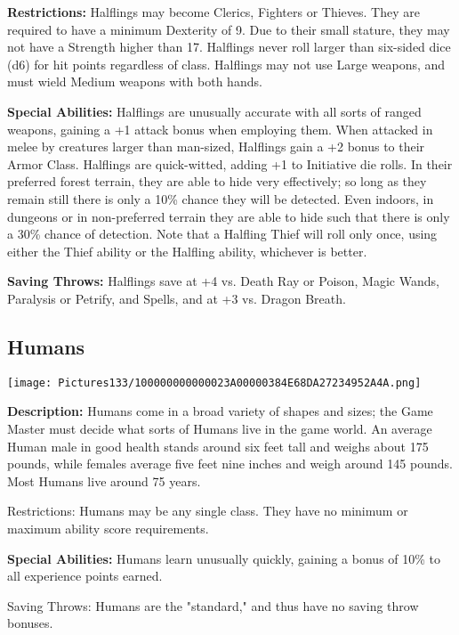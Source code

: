 \documentclass[a4paper,twoside,openany,10pt]{book}
\begin{document}
\begin{multicols}{2}
\textbf{Restrictions: } Halflings may become Clerics, Fighters or Thieves. They are required to have a minimum Dexterity of 9. Due to their small stature, they may not have a Strength higher than 17. Halflings never roll larger than six-sided dice (d6) for hit points regardless of class. Halflings may not use Large weapons, and must wield Medium weapons with both hands.

\textbf{Special Abilities:} Halflings are unusually accurate with all sorts of ranged weapons, gaining a +1 attack bonus when employing them. When attacked in melee by creatures larger than man-sized, Halflings gain a +2 bonus to their Armor Class. Halflings are quick-witted, adding +1 to Initiative die rolls. In their preferred forest terrain, they are able to hide very effectively; so long as they remain still there is only a 10\% chance they will be detected. Even indoors, in dungeons or in non-preferred terrain they are able to hide such that there is only a 30\% chance of detection. Note that a Halfling Thief will roll only once, using either the Thief ability or the Halfling ability, whichever is better.

\textbf{Saving Throws:} Halflings save at +4 vs. Death Ray or Poison, Magic Wands, Paralysis or Petrify, and Spells, and at +3 vs. Dragon Breath.

\subsection{Humans}\label{humans}

\begin{center}
	\texttt{[image: Pictures133/100000000000023A00000384E68DA27234952A4A.png]}
\end{center}\medskip

\textbf{Description:} Humans come in a broad variety of shapes and sizes; the Game Master must decide what sorts of Humans live in the game world. An average Human male in good health stands around six feet tall and weighs about 175 pounds, while females average five feet nine inches and weigh around 145 pounds. Most Humans live around 75 years.

Restrictions: Humans may be any single class. They have no minimum or maximum ability score requirements.

\textbf{Special Abilities:} Humans learn unusually quickly, gaining a bonus of 10\% to all experience points earned.

Saving Throws: Humans are the "standard," and thus have no saving throw bonuses.



\end{multicols}
\end{document}
